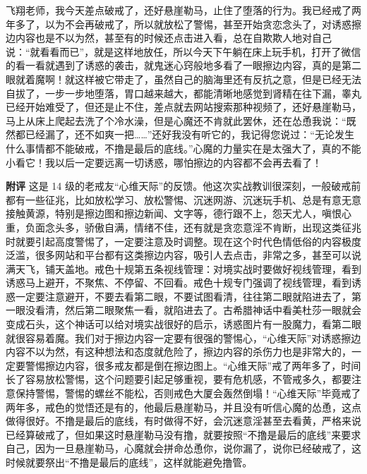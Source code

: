 \begin{case}
    飞翔老师，我今天差点破戒了，还好悬崖勒马，止住了堕落的行为。我已经戒了两年多了，以为不会再破戒了，所以就放松了警惕，甚至开始贪恋念头了，对诱惑擦边内容也是不以为然，甚至有的时候还点击进入看，总在自欺欺人地对自己说：“就看看而已”，就是这样地放任，所以今天下午躺在床上玩手机，打开了微信的看一看就遇到了诱惑的袭击，就鬼迷心窍般地多看了一眼擦边内容，真的是第二眼就着魔啊！就这样被它带走了，虽然自己的脑海里还有反抗之意，但是已经无法自拔了，一步一步地堕落，胃口越来越大，都能清晰地感觉到肾精在往下漏，睾丸已经开始难受了，但还是止不住，差点就去网站搜索那种视频了，还好悬崖勒马，马上从床上爬起去洗了个冷水澡，但是心魔还不肯就此罢休，还在怂恿我说：“既然都已经漏了，还不如爽一把……”还好我没有听它的，我记得您说过：“无论发生什么事情都不能破戒，不撸是最后的底线。”心魔的力量实在是太强大了，真的不能小看它！我以后一定要远离一切诱惑，哪怕擦边的内容都不会再去看了！

    \textbf{附评} 这是 14 级的老戒友“心维天际”的反馈。他这次实战教训很深刻，一般破戒前都有一些征兆，比如放松学习、放松警惕、沉迷网游、沉迷玩手机、总是有意无意接触黄源，特别是擦边图和擦边新闻、文字等，德行跟不上，怨天尤人，嗔恨心重，负面念头多，骄傲自满，情绪不佳，还有就是贪恋意淫不肯断，出现这类征兆时就要引起高度警惕了，一定要注意及时调整。现在这个时代色情低俗的内容极度泛滥，很多网站和平台都有这类擦边内容，吸引人去点击，非常之多，甚至可以说满天飞，铺天盖地。戒色十规第五条视线管理：对境实战时要做好视线管理，看到诱惑马上避开，不聚焦、不停留、不回看。戒色十规专门强调了视线管理，看到诱惑一定要注意避开，不要去看第二眼，不要试图看清，往往第二眼就陷进去了，第一眼没看清，然后第二眼聚焦一看，就陷进去了。古希腊神话中看美杜莎一眼就会变成石头，这个神话可以给对境实战很好的启示，诱惑图片有一股魔力，看第二眼就很容易着魔。我们对于擦边内容一定要有很强的警惕心，“心维天际”对诱惑擦边内容不以为然，有这种想法和态度就危险了，擦边内容的杀伤力也是非常大的，一定要警惕擦边内容，很多戒友都是倒在擦边图上。“心维天际”戒了两年多了，时间长了容易放松警惕，这个问题要引起足够重视，要有危机感，不管戒多久，都要注意保持警惕，警惕的螺丝不能松，否则戒色大厦会轰然倒塌！“心维天际”毕竟戒了两年多，戒色的觉悟还是有的，他最后悬崖勒马，并且没有听信心魔的怂恿，这点做得很好。不撸是最后的底线，有时做得不好，会沉迷意淫甚至去看黄，严格来说已经算破戒了，但如果这时悬崖勒马没有撸，就要按照“不撸是最后的底线”来要求自己，因为一旦悬崖勒马，心魔就会拼命怂恿你，说你漏了，说你已经破戒了，这时候就要祭出“不撸是最后的底线”，这样就能避免撸管。


\end{case}
